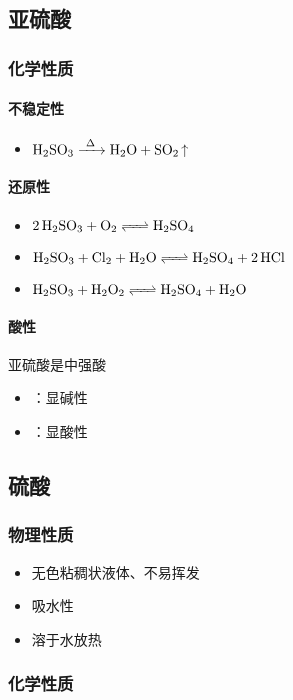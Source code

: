 \documentclass[a4paper]{article}
\begin{document}
	\subsection{亚硫酸}
	\subsubsection{化学性质}
	\paragraph{不稳定性}
	\begin{itemize}
		\item $\ce{H2SO3 ->[\Delta] H2O + SO2 ^}$
	\end{itemize}
	\paragraph{还原性}
	\begin{itemize}
		\item $\ce{2H2SO3 + O2 <=> H2SO4}$
		\item $\ce{H2SO3 + Cl2 + H2O <=> H2SO4 + 2HCl}$
		\item $\ce{H2SO3 + H2O2 <=> H2SO4 + H2O}$
	\end{itemize}
	\paragraph{酸性}
	亚硫酸是中强酸
	\begin{itemize}
		\item {}：显碱性
		\item {}：显酸性
	\end{itemize}
	
	\subsection{硫酸}
	\subsubsection{物理性质}
	\begin{itemize}
		\item 无色粘稠状液体、不易挥发
		\item 吸水性
		\item 溶于水放热
	\end{itemize}
	\subsubsection{化学性质}
\end{document}
